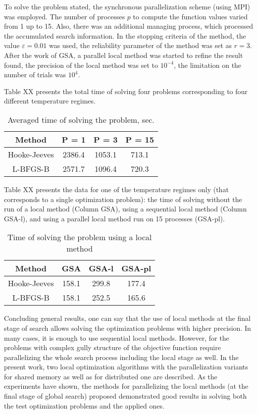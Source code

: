 \documentclass[runningheads]{llncs}
\begin{document}
To solve the problem stated, the synchronous parallelization scheme (using MPI) was employed. The number of processes $p$ to compute the function values varied from 1 up to 15. Also, there was an additional managing process, which processed the accumulated search information. In the stopping criteria of the method, the value $\varepsilon=0.01$ was used, the reliability parameter of the method was set as $r = 3$. After the work of GSA, a parallel local method was started to refine the result found, the precision of the local method was set to $10^{-4}$, the limitation on the number of trials was $10^4$. 

Table XX presents the total time of solving four problems corresponding to four different temperature regimes.

\begin{table}[ht]
	\caption{Averaged time of solving the problem, sec.}
	\label{tab:11}
	\center
		\begin{tabular}{|c|c|c|c|}
		\hline
		Method & P = 1 & P = 3 &  P = 15 \\
		\hline 
		Hooke-Jeeves & 2386.4 & 1053.1 & 713.1  \\
		\hline
		L-BFGS-B & 2571.7  & 1096.4  & 720.3  \\
		\hline
	\end{tabular}
\end{table}

Table XX presents the data for one of the temperature regimes only (that corresponds to a single optimization problem): the time of solving without the run of a local method (Column GSA), using a sequential local method (Column GSA-l), and using a parallel local method run on 15 processes (GSA-pl).

\begin{table}[ht]
	\caption{Time of solving the problem using a local method}
	\label{tab:12}
	\center
		\begin{tabular}{|c|c|c|c|}
		\hline
		Method & GSA & GSA-l & GSA-pl \\
		\hline 
		Hooke-Jeeves & 158.1 & 299.8  & 177.4 \\
		\hline
		L-BFGS-B & 158.1  & 252.5  & 165.6  \\
		\hline
	\end{tabular}
\end{table}

Concluding general results, one can say that the use of local methods at the final stage of search allows solving the optimization problems with higher precision. In many cases, it is enough to use sequential local methods. However, for the problems with complex gully structure of the objective function require parallelizing the whole search process including the local stage as well. In the present work, two local optimization algorithms with the parallelization variants for shared memory as well as for distributed one are described. As the experiments have shown, the methods for parallelizing the local methods (at the final stage of global search) proposed demonstrated good results in solving both the test optimization problems and the applied ones. 
\end{document}
